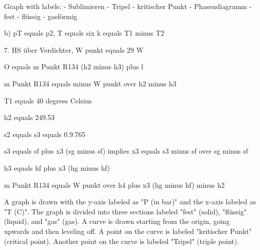 Graph with labels:
- Sublimieren
- Tripel
- kritischer Punkt
- Phasendiagramm
- fest
- flüssig
- gasförmig

b) pT equals p2, T equals six k equals T1 minus T2

7. HS über Verdichter, W punkt equals 29 W

O equals m Punkt R134 (h2 minus h3) plus l

m Punkt R134 equals minus W punkt over h2 minus h3

T1 equals 40 degrees Celsius

h2 equals 249.53

s2 equals s3 equals 0.9.765

s3 equals sf plus x3 (sg minus sf) implies x3 equals s3 minus sf over sg minus sf

h3 equals hf plus x3 (hg minus hf)

m Punkt R134 equals W punkt over h4 plus x3 (hg minus hf) minus h2

A graph is drawn with the y-axis labeled as "P (in bar)" and the x-axis labeled as "T (C)". The graph is divided into three sections labeled "fest" (solid), "flüssig" (liquid), and "gas" (gas). A curve is drawn starting from the origin, going upwards and then leveling off. A point on the curve is labeled "kritischer Punkt" (critical point). Another point on the curve is labeled "Tripel" (triple point).